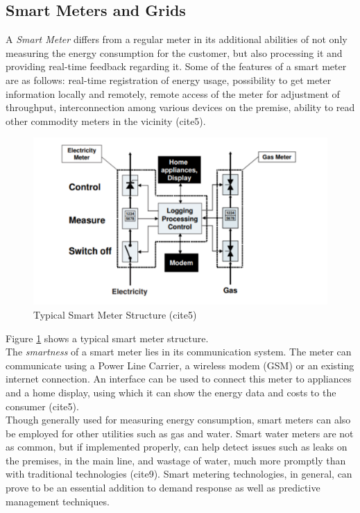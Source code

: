 \subsection{Smart Meters and Grids}
A {\em Smart Meter} differs from a regular meter in its additional abilities of not only measuring the energy consumption for the customer, but also processing it and providing real-time feedback regarding it. Some of the features of a smart meter are as follows:  real-time registration of energy usage, possibility to get meter information locally and remotely, remote access of the meter for adjustment of throughput, interconnection among various devices on the premise, ability to read other commodity meters in the vicinity (cite5).
\begin{figure}
	\includegraphics[width=\columnwidth]{images/smart_meter.pdf}
	\caption{Typical Smart Meter Structure (cite5)}
	\label{F:smart}
\end{figure}
Figure \ref{F:smart} shows a typical smart meter structure.\\
The {\em smartness} of a smart meter lies in its communication system. The meter can communicate using a Power Line Carrier, a wireless modem (GSM) or an existing internet connection. An interface can be used to connect this meter to appliances and a home display, using which it can show the energy data and costs to the consumer (cite5).\\
Though generally used for measuring energy consumption, smart meters can also be employed for other utilities such as gas and water. Smart water meters are not as common, but if implemented properly, can help detect issues such as leaks on the premises, in the main line, and wastage of water, much more promptly than with traditional technologies (cite9). Smart metering technologies, in general, can prove to be an essential addition to demand response as well as predictive management techniques.\\

